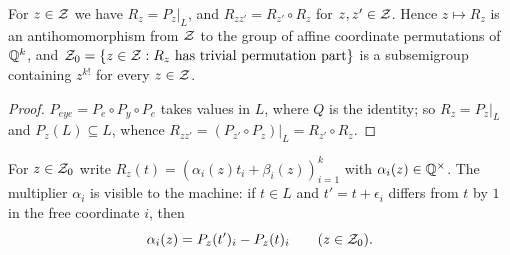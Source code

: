 \begin{lemma}\label{lem:Zhom}
For $z\in\mathcal{Z}$ we have $R_z=P_z|_L$, and $R_{zz'}=R_{z'}\circ R_z$ for $z,z'\in\mathcal{Z}$. Hence $z\mapsto R_z$ is an antihomomorphism from $\mathcal{Z}$ to the group of affine coordinate permutations of $\mathbb{Q}^k$, and $\mathcal{Z}_0=\{z\in\mathcal{Z}:R_z\text{ has trivial permutation part}\}$ is a subsemigroup containing $z^{k!}$ for every $z\in\mathcal{Z}$.
\end{lemma}
\begin{proof}
$P_{eye}=P_e\circ P_y\circ P_e$ takes values in $L$, where $Q$ is the identity; so $R_z=P_z|_L$ and $P_z(L)\subseteq L$, whence $R_{zz'}=(P_{z'}\circ P_z)|_L=R_{z'}\circ R_z$.
\end{proof}

For $z\in\mathcal{Z}_0$ write $R_z(t)=(\alpha_i(z)t_i+\beta_i(z))_{i=1}^k$ with $\alpha_i(z)\in\mathbb{Q}^\times$. The multiplier $\alpha_i$ is visible to the machine: if $t\in L$ and $t'=t+\epsilon_i$ differs from $t$ by $1$ in the free coordinate $i$, then
\begin{equation}\label{eq:multiplier}
\alpha_i(z)=P_z(t')_i-P_z(t)_i\qquad(z\in\mathcal{Z}_0).
\end{equation}

